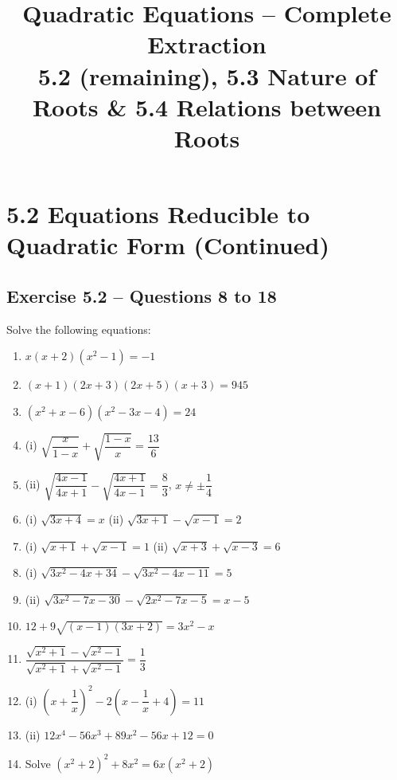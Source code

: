 \documentclass[12pt,a4paper]{article}
\title{\textbf{Quadratic Equations -- Complete Extraction}\\[0.3cm]
\large 5.2 (remaining), 5.3 Nature of Roots \& 5.4 Relations between Roots}
\author{}
\date{}
\begin{document}
\maketitle
\tableofcontents
\newpage

\section{5.2 Equations Reducible to Quadratic Form (Continued)}

\subsection{Exercise 5.2 -- Questions 8 to 18}

Solve the following equations:

\begin{enumerate}[start=8]
    \item \( x(x+2)(x^2-1) = -1 \)
    \item \( (x+1)(2x+3)(2x+5)(x+3) = 945 \)
    \item \( (x^2 + x - 6)(x^2 - 3x - 4) = 24 \)
    \item (i) \( \sqrt{\dfrac{x}{1-x}} + \sqrt{\dfrac{1-x}{x}} = \dfrac{13}{6} \)
    \item (ii) \( \sqrt{\dfrac{4x-1}{4x+1}} - \sqrt{\dfrac{4x+1}{4x-1}} = \dfrac{8}{3} \), \( x \neq \pm \dfrac{1}{4} \)
    \item (i) \( \sqrt{3x+4} = x \) \quad (ii) \( \sqrt{3x+1} - \sqrt{x-1} = 2 \)
    \item (i) \( \sqrt{x+1} + \sqrt{x-1} = 1 \) \quad (ii) \( \sqrt{x+3} + \sqrt{x-3} = 6 \)
    \item (i) \( \sqrt{3x^2 - 4x + 34} - \sqrt{3x^2 - 4x - 11} = 5 \)
    \item (ii) \( \sqrt{3x^2 - 7x - 30} - \sqrt{2x^2 - 7x - 5} = x - 5 \)
    \item \( 12 + 9\sqrt{(x-1)(3x+2)} = 3x^2 - x \)
    \item \( \dfrac{\sqrt{x^2+1} - \sqrt{x^2-1}}{\sqrt{x^2+1} + \sqrt{x^2-1}} = \dfrac{1}{3} \)
    \item (i) \( \left(x + \dfrac{1}{x}\right)^2 - 2\left(x - \dfrac{1}{x} + 4\right) = 11 \)
    \item (ii) \( 12x^4 - 56x^3 + 89x^2 - 56x + 12 = 0 \)
    \item Solve \( (x^2 + 2)^2 + 8x^2 = 6x(x^2 + 2) \)
\end{enumerate}
\end{document}
